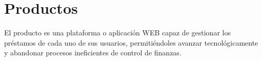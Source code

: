 \section{Productos}

{El producto es una plataforma o aplicación WEB capaz de gestionar los préstamos de cada uno de sus usuarios, permitiéndoles avanzar tecnológicamente y abandonar procesos ineficientes de control de finanzas.}